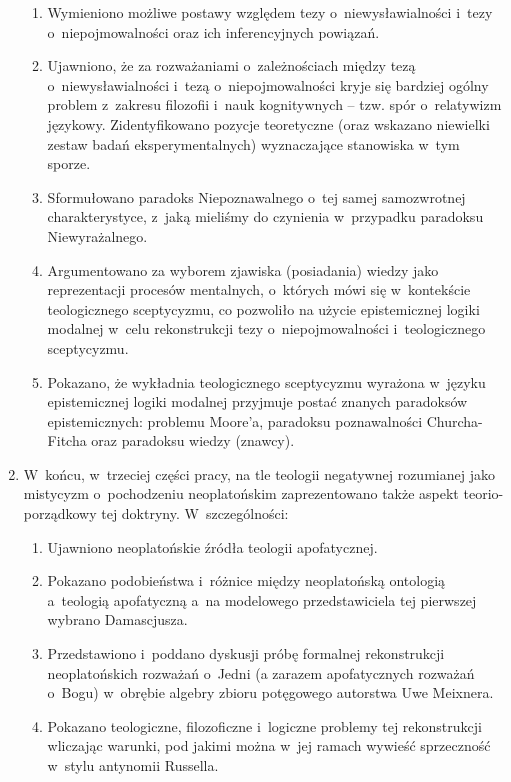 \begin{enumerate}
\begin{enumerate}
\item Wymieniono możliwe postawy względem tezy o~niewysławialności i~tezy o~niepojmowalności oraz ich inferencyjnych powiązań.
\item Ujawniono, że za rozważaniami o~zależnościach między tezą o~niewysławialności i~tezą o~niepojmowalności kryje się bardziej ogólny problem z~zakresu filozofii i~nauk kognitywnych -- tzw. spór o~relatywizm językowy. Zidentyfikowano pozycje teoretyczne (oraz wskazano niewielki zestaw badań eksperymentalnych) wyznaczające stanowiska w~tym sporze.
\item Sformułowano paradoks Niepoznawalnego o~tej samej samozwrotnej charakterystyce, z~jaką mieliśmy do czynienia w~przypadku paradoksu Niewyrażalnego.
\item Argumentowano za wyborem zjawiska (posiadania) wiedzy jako reprezentacji procesów mentalnych, o~których mówi się w~kontekście teologicznego sceptycyzmu, co pozwoliło na użycie epistemicznej logiki modalnej w~celu rekonstrukcji tezy o~niepojmowalności i~teologicznego sceptycyzmu.
\item Pokazano, że wykładnia teologicznego sceptycyzmu wyrażona w~języku epistemicznej logiki modalnej przyjmuje postać znanych paradoksów epistemicznych: problemu Moore'a, paradoksu poznawalności Churcha-Fitcha oraz paradoksu wiedzy (znawcy).
\end{enumerate}
\item W~końcu, w~trzeciej części pracy, na tle teologii negatywnej rozumianej jako mistycyzm o~pochodzeniu neoplatońskim zaprezentowano także aspekt teorio-porządkowy tej doktryny. W~szczególności:
\begin{enumerate}
\item Ujawniono neoplatońskie źródła teologii apofatycznej.
\item Pokazano podobieństwa i~różnice między neoplatońską ontologią a~teologią apofatyczną a~na modelowego przedstawiciela tej pierwszej wybrano Damascjusza.
\item Przedstawiono i~poddano dyskusji próbę formalnej rekonstrukcji neoplatońskich rozważań o~Jedni (a zarazem apofatycznych rozważań o~Bogu) w~obrębie algebry zbioru potęgowego autorstwa Uwe Meixnera.
\item Pokazano teologiczne, filozoficzne i~logiczne problemy tej rekonstrukcji wliczając warunki, pod jakimi można w~jej ramach wywieść sprzeczność w~stylu antynomii Russella.
\end{enumerate}
\end{enumerate}
